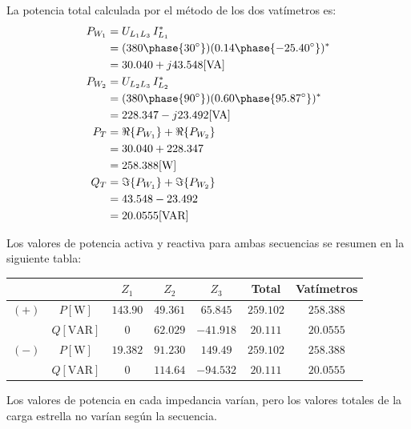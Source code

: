 \documentclass[letter,11pt]{article}
\begin{document}
\begin{enumerate}
La potencia total calculada por el método de los dos vatímetros es:
\begin{equation*}
    \begin{split}
        P_{W_1} &= U_{L_1 L_3}\,I_{L_1}^*\\
                &= (380\phase{30^{\circ}})(0.14\phase{-25.40^{\circ}})^*\\
                &= 30.040 + j43.548[\text{VA}]\\
        P_{W_2} &= U_{L_2 L_3}\,I_{L_2}^*\\
                &= (380\phase{90^{\circ}})(0.60\phase{95.87^{\circ}})^*\\
                &= 228.347 - j23.492[\text{VA}]\\
        P_T &= \Re\{P_{W_1}\} + \Re\{P_{W_2}\}\\
            &= 30.040 + 228.347\\
            &= 258.388[\text{W}]\\
        Q_T &= \Im\{P_{W_1}\} + \Im\{P_{W_2}\}\\
            &= 43.548 - 23.492\\
            &= 20.0555[\text{VAR}]\\
    \end{split}
\end{equation*}

Los valores de potencia activa y reactiva para ambas secuencias se resumen en la
siguiente tabla:

\begin{center}
    \begin{tabular}{|c|c||c|c|c|c||c|}
    \hline
    & & \textbf{$Z_1$} & $Z_2$ & $Z_3$ & \textbf{Total} & \textbf{Vatímetros}
    \tabularnewline \hline \hline
    $(+)$ &
    $P[\text{W}]$ &
    $143.90$ &
    $49.361$ &
    $65.845$ &
    $259.102$ &
    $258.388$
    \tabularnewline \hline
    & $Q[\text{VAR}]$ &
    $0$ &
    $62.029$ &
    $-41.918$ &
    $20.111$ &
    $20.0555$
    \tabularnewline \hline \hline
    $(-)$ &
    $P[\text{W}]$ &
    $19.382$ &
    $91.230$ &
    $149.49$ &
    $259.102$ &
    $258.388$
    \tabularnewline \hline
    & $Q[\text{VAR}]$ &
    $0$ &
    $114.64$ &
    $-94.532$ &
    $20.111$ &
    $20.0555$
    \tabularnewline \hline
    \end{tabular}
\end{center}

Los valores de potencia en cada impedancia varían, pero los valores totales de
la carga estrella no varían según la secuencia.


\end{enumerate}
\end{document}
